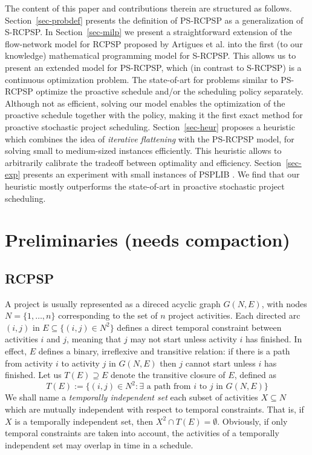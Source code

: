  	The content of this paper and contributions therein are structured as follows.
 	Section~\ref{sec-probdef} presents the definition of PS-RCPSP as a generalization of S-RCPSP.
 	In Section~\ref{sec-milp} we present a straightforward extension of the flow-network model for RCPSP
 	proposed by Artigues et al. \cite{artigues2003insertion} 
 	into the first (to our knowledge) mathematical programming model for S-RCPSP.
 	This allows us to present an extended model for PS-RCPSP,
 	which (in contrast to S-RCPSP) is a continuous optimization problem.
 	The state-of-art for problems similar to PS-RCPSP 
 	\cite{van2006trade,van2008,deblaere2011proactive,lamas2014purely}
 	optimize the proactive schedule and/or the scheduling policy separately.
 	Although not as efficient,
 	solving our model enables the optimization of the proactive schedule together with the policy,
 	making it the first exact method for proactive stochastic project scheduling.
 	Section~\ref{sec-heur} proposes a heuristic which combines the idea of
 	\emph{iterative flattening} \cite{oddi2009iterative} with the PS-RCPSP model,
  	for solving small to medium-sized instances efficiently.
  	This heuristic allows to arbitrarily calibrate the tradeoff between optimality and efficiency.
 	Section~\ref{sec-exp} presents an experiment 
 	with small instances of PSPLIB \cite{kolisch1997psplib}.
 	We find that our heuristic mostly outperforms the 
 	state-of-art in proactive stochastic project scheduling.
 	
	\section{Preliminaries (needs compaction)}
	\label{sec-prelim}
 	
 	\subsection{RCPSP}
 	 	
	A project is usually represented as a direced acyclic graph $G(N,E)$,
	with nodes $N=\{1,\ldots,n\}$ corresponding to the set of $n$ project activities.
	Each directed arc $(i,j)$ in $E \subseteq \{(i,j) \in N^2\}$ defines a direct
	temporal constraint between activities $i$ and $j$,
	meaning that $j$ may not start unless activity $i$ has finished.
 	In effect, $E$ defines a binary, irreflexive and transitive relation:
 	if there is a path from activity $i$ to activity 
 	$j$ in $G(N,E)$ then $j$ cannot start unless $i$ has finished.
	Let us $T(E) \supseteq E$ denote the transitive closure of $E$, 
	defined as 
	\[
		T(E) := \{(i,j) \in N^2 : \exists 
		\textrm{ a path from } i \textrm{ to } j \textrm { in } G(N,E)\}
	\]
	We shall name a \emph{temporally independent set} each
	subset of activities $X \subseteq N$ which are mutually 
	independent with respect to temporal constraints.
	That is, if $X$ is a temporally independent set, then $X^2 \cap T(E) = \emptyset$.
	Obviously, if only temporal constraints are taken into account, 
	the activities of a temporally independent set may overlap in time in a schedule.
	
